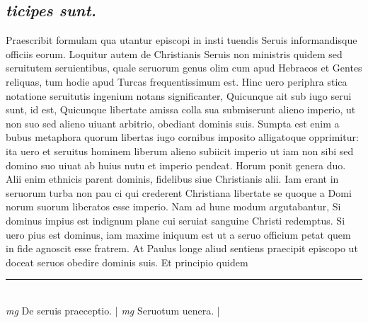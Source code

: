 \documentclass{article}
\begin{document}
\begin{pages}
\subsection*{\textit{ticipes sunt. }}\pstart Praescribit formulam qua utantur episcopi in insti tuendis Seruis informandisque officiis eorum. Loquitur autem de Christianis Seruis non ministris quidem sed seruitutem seruientibus, quale seruorum genus olim cum apud Hebraeos et Gentes reliquas, tum hodie apud Turcas frequentissimum est. Hinc uero periphra stica notatione seruitutis ingenium notans significanter, Quicunque ait sub iugo serui sunt, id est, Quicunque  libertate amissa colla sua submiserunt alieno imperio, ut non suo sed alieno uiuant arbitrio, obediant dominis suis. Sumpta est enim a bubus metaphora quorum libertas iugo cornibus imposito alligatoque opprimitur: ita uero et seruitus hominem liberum alieno subiicit imperio ut iam non sibi sed domino suo uiuat ab huius nutu et imperio pendeat. Horum ponit genera duo. Alii enim ethnicis parent dominis, fidelibus siue Christianis alii. Iam erant in seruorum turba non pau ci qui crederent Christiana libertate se quoque a Domi norum suorum liberatos esse imperio. Nam ad hune modum argutabantur, Si dominus impius est indignum plane cui seruiat sanguine Christi redemptus. Si uero pius est dominus, iam maxime iniquum est ut a seruo officium petat quem in fide agnoscit esse fratrem. At Paulus longe aliud sentiens praecipit episcopo ut doceat seruos obedire dominis suis. Et principio quidem  \pend
\vspace{0.5cm}\noindent
\vspace{0.2cm}\rule{1cm}{0.2pt}\\ 
\hspace{0.2cm}\textit{mg}
\footnotesize De seruis praeceptio. 
\normalsize| 
\hspace{0.2cm}\textit{mg}
\footnotesize Seruotum uenera. 
\normalsize| 

\end{pages}
\end{document}
